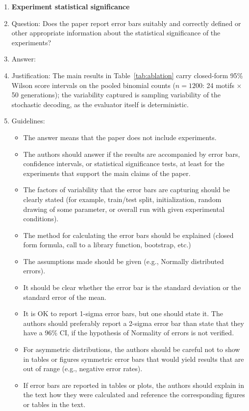 \documentclass{article}
\begin{document}
\begin{enumerate}
\item {\bf Experiment statistical significance}
    \item[] Question: Does the paper report error bars suitably and correctly defined or other appropriate information about the statistical significance of the experiments?
    \item[] Answer: \answerYes{}
    \item[] Justification: The main results in Table~\ref{tab:ablation} carry closed-form 95\% Wilson score intervals on the pooled binomial counts ($n{=}1200$: 24 motifs $\times$ 50 generations); the variability captured is sampling variability of the stochastic decoding, as the evaluator itself is deterministic.
    \item[] Guidelines:
    \begin{itemize}
        \item The answer \answerNA{} means that the paper does not include experiments.
        \item The authors should answer \answerYes{} if the results are accompanied by error bars, confidence intervals, or statistical significance tests, at least for the experiments that support the main claims of the paper.
        \item The factors of variability that the error bars are capturing should be clearly stated (for example, train/test split, initialization, random drawing of some parameter, or overall run with given experimental conditions).
        \item The method for calculating the error bars should be explained (closed form formula, call to a library function, bootstrap, etc.)
        \item The assumptions made should be given (e.g., Normally distributed errors).
        \item It should be clear whether the error bar is the standard deviation or the standard error of the mean.
        \item It is OK to report 1-sigma error bars, but one should state it. The authors should preferably report a 2-sigma error bar than state that they have a 96\% CI, if the hypothesis of Normality of errors is not verified.
        \item For asymmetric distributions, the authors should be careful not to show in tables or figures symmetric error bars that would yield results that are out of range (e.g., negative error rates).
        \item If error bars are reported in tables or plots, the authors should explain in the text how they were calculated and reference the corresponding figures or tables in the text.
    \end{itemize}


\end{enumerate}
\end{document}
